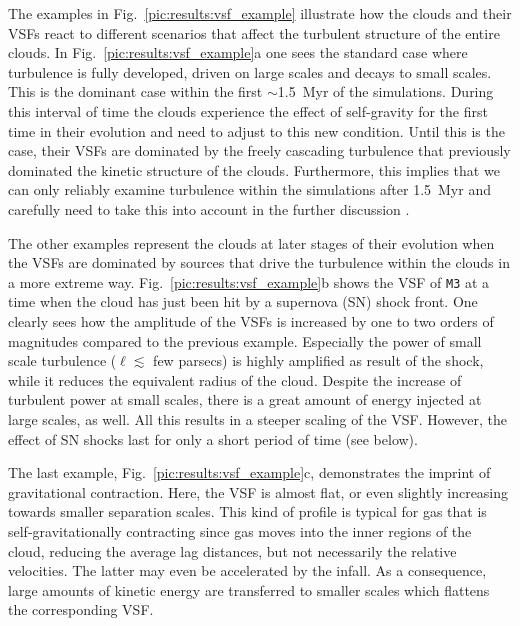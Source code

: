The examples in Fig.~\ref{pic:results:vsf_example} illustrate how the clouds and their VSFs react to different scenarios that affect the turbulent structure of the entire clouds. 
In Fig.~\ref{pic:results:vsf_example}a one sees the standard case where turbulence is fully developed, driven on large scales and decays to small scales.
This is the dominant case within the first $\sim$1.5~Myr of the simulations.
During this interval of time the clouds experience the effect of self-gravity for the first time in their evolution and need to adjust to this new condition.
Until this is the case, their VSFs are dominated by the freely cascading turbulence that previously dominated the kinetic structure of the clouds.
Furthermore, this implies that we can only reliably examine turbulence within the simulations after 1.5~Myr and carefully need to take this into account in the further discussion \citep[see][]{IbanezMejia2017,Seifried2017b}.

The other examples represent the clouds at later stages of their evolution when the VSFs are dominated by sources that drive the turbulence within the clouds in a more extreme way.
Fig.~\ref{pic:results:vsf_example}b shows the VSF of \texttt{M3} at a time when the cloud has just been hit by a supernova (SN) shock front. 
One clearly sees how the amplitude of the VSFs is increased by one to two orders of magnitudes compared to the previous example.
Especially the power of small scale turbulence ($\ell \lesssim$ few parsecs) is highly amplified as result of the shock, while it reduces the equivalent radius of the cloud.
Despite the increase of turbulent power at small scales, there is a great amount of energy injected at large scales, as well.
All this results in a steeper scaling of the VSF.
However, the effect of SN shocks last for only a short period of time (see below).

The last example, Fig.~\ref{pic:results:vsf_example}c, demonstrates the imprint of gravitational contraction.
Here, the VSF is almost flat, or even slightly increasing towards smaller separation scales. 
This kind of profile is typical for gas that is self-gravitationally contracting \citep{Boneberg2015,Burkhart2015} since gas moves into the inner regions of the cloud, reducing the average lag distances, but not necessarily the relative velocities.
The latter may even be accelerated by the infall.
As a consequence, large amounts of kinetic energy are transferred to smaller scales which flattens the corresponding VSF.


\endinput
